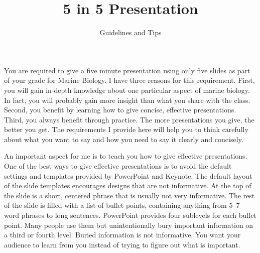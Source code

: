 \documentclass[letterpaper]{memoir}
\title{5 in 5 Presentation}
\author{Guidelines and Tips}
\date{} %
\newcommand{\insertslide}[2]{%
  \framebox{\texttt{[image: \#2]}}
}
\begin{document}
\maketitle	%
{\baselineskip\sidepar{\insertslide{1}{5_in_5_overview.pdf}}}


You are required to give a five minute presentation using only five slides as part of your grade for Marine Biology. I have three reasons for this requirement. First, you will gain in-depth knowledge about one particular aspect of marine biology. In fact, you will probably gain more insight than what you share with the class.  Second, you benefit by learning how to give concise, effective presentations. Third, you always benefit through practice. The more presentations you give, the better you get. The requirements I provide here will help you to think carefully about what you want to say and how you need to say it clearly and concisely.

An important aspect for me is to teach you how to give effective presentations. One of the best ways to give effective presentations is to avoid the default settings and templates provided by PowerPoint and Keynote. The default layout of the slide templates encourages designs that are not informative. At the top of the slide is a short, centered phrase that is usually not very informative. The rest of the slide is filled with a list of bullet points, containing anything from 5--7 word phrases to long sentences. PowerPoint provides four sublevels for each bullet point. Many people use them but unintentionally bury important information on a third or fourth level. Buried information is not informative. You want your audience to learn from you instead of trying to figure out what is important.

%
\end{document}
